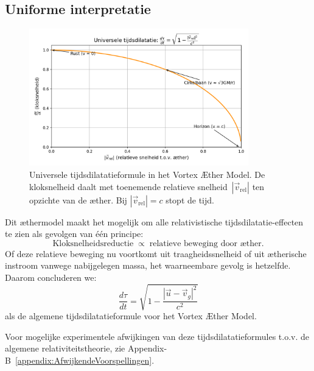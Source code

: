 \subsection*{Uniforme interpretatie}
\begin{figure}[htbp]
    \centering
    \includegraphics[width=0.85\textwidth]{11-TijdsvertragingRelatieveBeweging_nl}
    \caption{Universele tijdsdilatatieformule in het Vortex Æther Model. De kloksnelheid daalt met toenemende relatieve snelheid~$|\vec{v}_{\mathrm{rel}}|$ ten opzichte van de æther. Bij $|\vec{v}_{\mathrm{rel}}| = c$ stopt de tijd.}
    \label{fig:TijdsvertragingRelatieveBeweging}
\end{figure}

Dit æthermodel maakt het mogelijk om alle relativistische tijdsdilatatie-effecten te zien als gevolgen van één principe:
\[
    \text{Kloksnelheidsreductie} \;\propto\; \text{relatieve beweging door æther}.
\]
Of deze relatieve beweging nu voortkomt uit traagheidssnelheid of uit ætherische instroom vanwege nabijgelegen massa, het waarneembare gevolg is hetzelfde. Daarom concluderen we:
\[
    \boxed{\frac{d\tau}{dt} = \sqrt{1 - \frac{|\vec{u} - \vec{v}_g|^2}{c^2}}}
\]
als de algemene tijdsdilatatieformule voor het Vortex Æther Model.

Voor mogelijke experimentele afwijkingen van deze tijdsdilatatieformules t.o.v. de algemene relativiteitstheorie, zie Appendix-B~\ref{appendix:AfwijkendeVoorspellingen}.